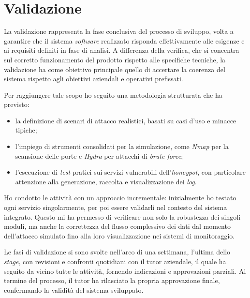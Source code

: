 \section{Validazione}
La validazione rappresenta la fase conclusiva del processo di sviluppo, volta a garantire che il sistema \textit{software} realizzato risponda effettivamente alle esigenze e ai requisiti definiti in fase di analisi. A differenza della verifica, che si concentra sul corretto funzionamento del prodotto rispetto alle specifiche tecniche, la validazione ha come obiettivo principale quello di accertare la coerenza del sistema rispetto agli obiettivi aziendali e operativi prefissati.  

Per raggiungere tale scopo ho seguito una metodologia strutturata che ha previsto:
\begin{itemize}
    \item la definizione di scenari di attacco realistici, basati su casi d'uso e minacce tipiche;
    \item l'impiego di strumenti consolidati per la simulazione, come \textit{Nmap} per la scansione delle porte e \textit{Hydra} per attacchi di \textit{brute-force};
    \item l'esecuzione di \textit{test} pratici sui servizi vulnerabili dell'\textit{honeypot}, con particolare attenzione alla generazione, raccolta e visualizzazione dei \textit{log}.
\end{itemize}

Ho condotto le attività con un approccio incrementale: inizialmente ho testato ogni servizio singolarmente, per poi essere validarli nel contesto del sistema integrato. Questo mi ha permesso di verificare non solo la robustezza dei singoli moduli, ma anche la correttezza del flusso complessivo dei dati dal momento dell'attacco simulato fino alla loro visualizzazione nei sistemi di monitoraggio.  

Le fasi di validazione si sono svolte nell'arco di una settimana, l'ultima dello \textit{stage}, con revisioni e confronti quotidiani con il tutor aziendale, il quale ha seguito da vicino tutte le attività, fornendo indicazioni e approvazioni parziali. Al termine del processo, il tutor ha rilasciato la propria approvazione finale, confermando la validità del sistema sviluppato.  

